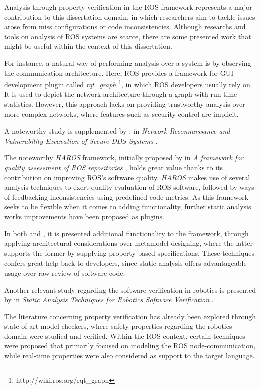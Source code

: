 Analysis through property verification in the ROS framework represents a major contribution to this dissertation domain, in which researchers aim to tackle issues arose from miss configurations or code inconsistencies. Although researchs and tools on analysis of ROS systems are scarce, there are some presented work that might be useful within the context of this dissertation.

For instance, a natural way of performing analysis over a system is by observing the communication architecture. Here, ROS provides a framework for GUI development plugin called \textit{rqt\_graph} \footnote[2]{http://wiki.ros.org/rqt\_graph}, in which ROS developers usually rely on. It is used to depict the network architecture through a graph with run-time statistics. However, this approach lacks on providing trustworthy analysis over more complex networks, where features such as security control are implicit.

A noteworthy study is supplemented by \citeauthor*{white2019network}, in \textit{Network Reconnaissance and Vulnerability Excavation of Secure DDS Systems} \cite{white2019network}.

The noteworthy \textit{HAROS} framework, initially proposed by \citeauthor{santos2016framework} in \textit{A framework for quality assessment of ROS repositories} \cite{santos2016framework}, holds great value thanks to its contribution on improving ROS's software quality. \textit{HAROS} makes use of several analysis techniques to exert quality evaluation of ROS software, followed by ways of feedbacking inconsistencies using predefined code metrics. As this framework seeks to be flexible when it comes to adding functionality, further static analysis works improvements have been proposed as plugins.

In both  and , it is presented additional functionality to the framework, through applying architectural considerations over metamodel designing, where the latter supports the former by supplying property-based specifications. These techniques confers great help back to developers, since static analysis offers advantageable usage over raw review of software code. 

Another relevant study regarding the software verification in robotics is presented by \citeauthor{cortesi2013static} in \textit{Static Analysis Techniques
for Robotics Software Verification} \cite{cortesi2013static}. 

The literature concerning property verification has already been explored through state-of-art model checkers, where safety properties regarding the robotics domain were studied and verified. Within the ROS context, certain techniques were proposed that primarily focused on modeling the ROS node-communication, while real-time properties were also considered as support to the target language.
 
